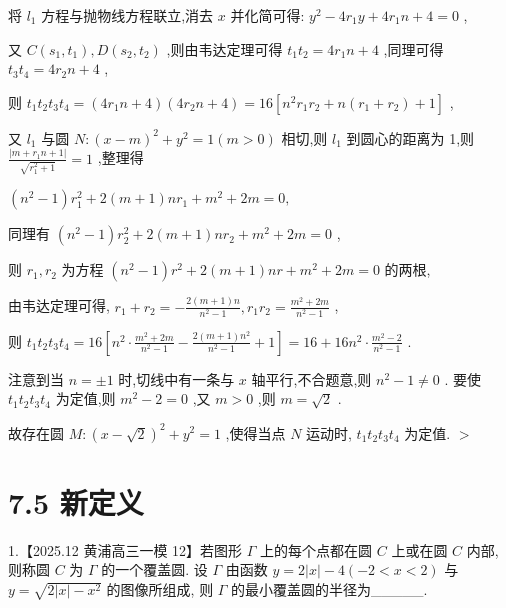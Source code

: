\documentclass[10pt]{article}
\begin{document}
将 \({l}_{1}\) 方程与抛物线方程联立,消去 \(x\) 并化简可得: \({y}^{2} - 4{r}_{1}y + 4{r}_{1}n + 4 = 0\) ,

又 \(C\left( {{s}_{1},{t}_{1}}\right) ,D\left( {{s}_{2},{t}_{2}}\right)\) ,则由韦达定理可得 \({t}_{1}{t}_{2} = 4{r}_{1}n + 4\) ,同理可得 \({t}_{3}{t}_{4} = 4{r}_{2}n + 4\) ,

则 \({t}_{1}{t}_{2}{t}_{3}{t}_{4} = \left( {4{r}_{1}n + 4}\right) \left( {4{r}_{2}n + 4}\right)  = {16}\left\lbrack  {{n}^{2}{r}_{1}{r}_{2} + n\left( {{r}_{1} + {r}_{2}}\right)  + 1}\right\rbrack\) ,

又 \({l}_{1}\) 与圆 \(N : {\left( x - m\right) }^{2} + {y}^{2} = 1\left( {m > 0}\right)\) 相切,则 \({l}_{1}\) 到圆心的距离为 1,则 \(\frac{\left| m + {r}_{1}n + 1\right| }{\sqrt{{r}_{1}^{2} + 1}} = 1\) ,整理得

\(\left( {{n}^{2} - 1}\right) {r}_{1}^{2} + 2\left( {m + 1}\right) n{r}_{1} + {m}^{2} + {2m} = 0,\)

同理有 \(\left( {{n}^{2} - 1}\right) {r}_{2}^{2} + 2\left( {m + 1}\right) n{r}_{2} + {m}^{2} + {2m} = 0\) ,

则 \({r}_{1},{r}_{2}\) 为方程 \(\left( {{n}^{2} - 1}\right) {r}^{2} + 2\left( {m + 1}\right) {nr} + {m}^{2} + {2m} = 0\) 的两根,

由韦达定理可得, \({r}_{1} + {r}_{2} =  - \frac{2\left( {m + 1}\right) n}{{n}^{2} - 1},{r}_{1}{r}_{2} = \frac{{m}^{2} + {2m}}{{n}^{2} - 1}\) ,

则 \({t}_{1}{t}_{2}{t}_{3}{t}_{4} = {16}\left\lbrack  {{n}^{2} \cdot  \frac{{m}^{2} + {2m}}{{n}^{2} - 1} - \frac{2\left( {m + 1}\right) {n}^{2}}{{n}^{2} - 1} + 1}\right\rbrack   = {16} + {16}{n}^{2} \cdot  \frac{{m}^{2} - 2}{{n}^{2} - 1}\) .

注意到当 \(n =  \pm  1\) 时,切线中有一条与 \(x\) 轴平行,不合题意,则 \({n}^{2} - 1 \neq  0\) . 要使 \({t}_{1}{t}_{2}{t}_{3}{t}_{4}\) 为定值,则 \({m}^{2} - 2 = 0\) ,又 \(m > 0\) ,则 \(m = \sqrt{2}\) .

故存在圆 \(M : {\left( x - \sqrt{2}\right) }^{2} + {y}^{2} = 1\) ,使得当点 \(N\) 运动时, \({t}_{1}{t}_{2}{t}_{3}{t}_{4}\) 为定值. \(>\)

\section*{7.5 新定义}

1.【2025.12 黄浦高三一模 12】若图形 \(\Gamma\) 上的每个点都在圆 \(C\) 上或在圆 \(C\) 内部,则称圆 \(C\) 为 \(\Gamma\) 的一个覆盖圆. 设 \(\Gamma\) 由函数 \(y = 2\left| x\right|  - 4\left( {-2 < x < 2}\right)\) 与 \(y = \sqrt{2\left| x\right|  - {x}^{2}}\) 的图像所组成, 则 \(\Gamma\) 的最小覆盖圆的半径为\_\_\_\_\_.
\end{document}
